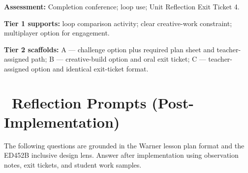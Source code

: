 \documentclass[12pt]{article}
\begin{document}
\begin{assessbox}
\textbf{Assessment:} Completion conference; loop use; Unit Reflection Exit Ticket 4.\par
\textbf{Tier 1 supports:} loop comparison activity; clear creative-work constraint; multiplayer option for engagement.\par
\textbf{Tier 2 scaffolds:} A --- challenge option plus required plan sheet and teacher-assigned path; B --- creative-build option and oral exit ticket; C --- teacher-assigned option and identical exit-ticket format.
\end{assessbox}

\clearpage
\section{\texorpdfstring{\faCommentDots\ Reflection Prompts (Post-Implementation)}{Reflection Prompts (Post-Implementation)}}

The following questions are grounded in the Warner lesson plan format and the ED452B inclusive design lens. Answer after implementation using observation notes, exit tickets, and student work samples.
\end{document}
